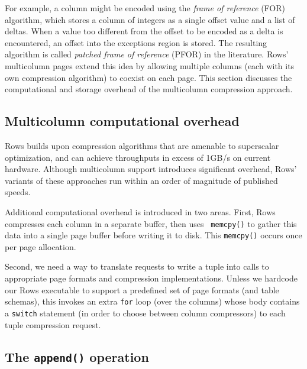 \documentclass{sig-alternate-sigmod08}
\newcommand{\rows}{Rows\xspace}
\newcommand{\rowss}{Rows'\xspace}
\begin{document}
For example, a column might be encoded using the {\em frame of
  reference} (FOR) algorithm, which stores a column of integers as a
single offset value and a list of deltas.  When a value too different
from the offset to be encoded as a delta is encountered, an offset
into the exceptions region is stored.  The resulting algorithm is
called {\em patched frame of reference} (PFOR) in the literature.
\rowss multicolumn pages extend this idea by allowing multiple columns
(each with its own compression algorithm) to coexist on each page.
This section discusses the computational and storage overhead of the
multicolumn compression approach.

\subsection{Multicolumn computational overhead}

\rows builds upon compression algorithms that are amenable to
superscalar optimization, and can achieve throughputs in excess of
1GB/s on current hardware.  Although multicolumn support introduces
significant overhead, \rowss variants of these approaches run within
an order of magnitude of published speeds.

Additional computational overhead is introduced in two areas.  First,
\rows compresses each column in a separate buffer, then uses {\tt
  memcpy()} to gather this data into a single page buffer before
writing it to disk.  This {\tt memcpy()} occurs once per page
allocation.

Second, we need a way to translate requests to write a tuple into
calls to appropriate page formats and compression implementations.
Unless we hardcode our \rows executable to support a predefined set of
page formats (and table schemas), this invokes an extra {\tt for} loop
(over the columns) whose body contains a {\tt switch} statement (in
order to choose between column compressors) to each tuple compression
request.


\subsection{The {\tt \large append()} operation}
\end{document}
